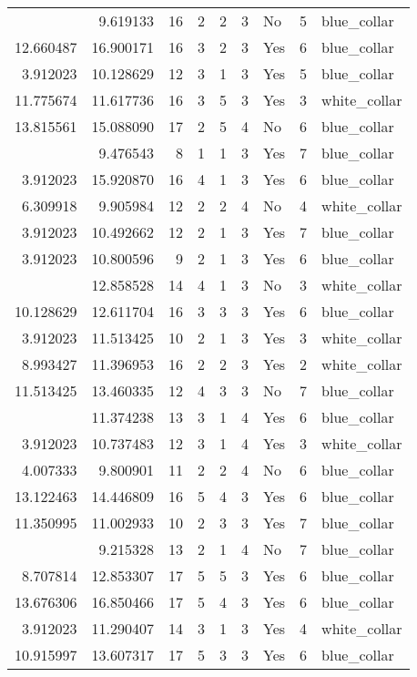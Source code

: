 \documentclass[
]{article}
\begin{document}
\begin{longtable}[t]{rrrrrllrl}
\addlinespace
9.396820 & 9.619133 & 16 & 2 & 2 & 3 & No & 5 & blue\_collar\\
12.660487 & 16.900171 & 16 & 3 & 2 & 3 & Yes & 6 & blue\_collar\\
3.912023 & 10.128629 & 12 & 3 & 1 & 3 & Yes & 5 & blue\_collar\\
11.775674 & 11.617736 & 16 & 3 & 5 & 3 & Yes & 3 & white\_collar\\
13.815561 & 15.088090 & 17 & 2 & 5 & 4 & No & 6 & blue\_collar\\
\addlinespace
3.912023 & 9.476543 & 8 & 1 & 1 & 3 & Yes & 7 & blue\_collar\\
3.912023 & 15.920870 & 16 & 4 & 1 & 3 & Yes & 6 & blue\_collar\\
6.309918 & 9.905984 & 12 & 2 & 2 & 4 & No & 4 & white\_collar\\
3.912023 & 10.492662 & 12 & 2 & 1 & 3 & Yes & 7 & blue\_collar\\
3.912023 & 10.800596 & 9 & 2 & 1 & 3 & Yes & 6 & blue\_collar\\
\addlinespace
3.912023 & 12.858528 & 14 & 4 & 1 & 3 & No & 3 & white\_collar\\
10.128629 & 12.611704 & 16 & 3 & 3 & 3 & Yes & 6 & blue\_collar\\
3.912023 & 11.513425 & 10 & 2 & 1 & 3 & Yes & 3 & white\_collar\\
8.993427 & 11.396953 & 16 & 2 & 2 & 3 & Yes & 2 & white\_collar\\
11.513425 & 13.460335 & 12 & 4 & 3 & 3 & No & 7 & blue\_collar\\
\addlinespace
3.912023 & 11.374238 & 13 & 3 & 1 & 4 & Yes & 6 & blue\_collar\\
3.912023 & 10.737483 & 12 & 3 & 1 & 4 & Yes & 3 & white\_collar\\
4.007333 & 9.800901 & 11 & 2 & 2 & 4 & No & 6 & blue\_collar\\
13.122463 & 14.446809 & 16 & 5 & 4 & 3 & Yes & 6 & blue\_collar\\
11.350995 & 11.002933 & 10 & 2 & 3 & 3 & Yes & 7 & blue\_collar\\
\addlinespace
3.912023 & 9.215328 & 13 & 2 & 1 & 4 & No & 7 & blue\_collar\\
8.707814 & 12.853307 & 17 & 5 & 5 & 3 & Yes & 6 & blue\_collar\\
13.676306 & 16.850466 & 17 & 5 & 4 & 3 & Yes & 6 & blue\_collar\\
3.912023 & 11.290407 & 14 & 3 & 1 & 3 & Yes & 4 & white\_collar\\
10.915997 & 13.607317 & 17 & 5 & 3 & 3 & Yes & 6 & blue\_collar\\

\end{longtable}
\end{document}
